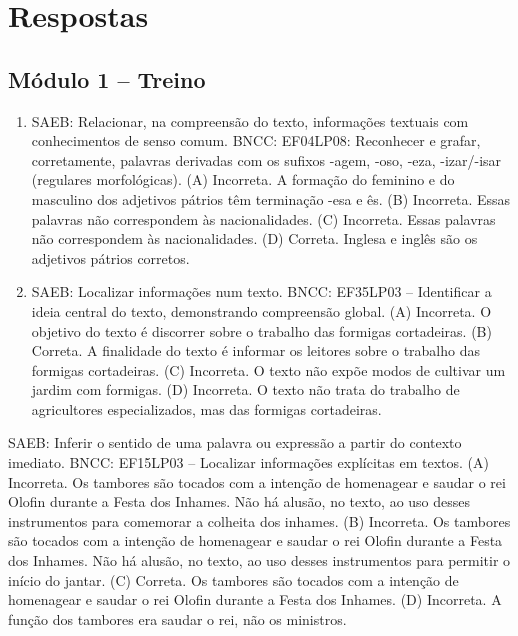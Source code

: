 
\chapter{Respostas}
\pagestyle{plain}
\footnotesize

\pagecolor{gray!40}

\section*{Módulo 1 – Treino}

\begin{enumerate}
\item
SAEB: Relacionar, na compreensão do texto, informações textuais
com conhecimentos de senso comum.
BNCC: EF04LP08: Reconhecer e grafar, corretamente, palavras derivadas
com os sufixos -agem, -oso, -eza, -izar/-isar (regulares morfológicas).
(A) Incorreta. A formação do feminino e do masculino dos adjetivos
pátrios têm terminação -esa e ês.
(B) Incorreta. Essas palavras não correspondem às nacionalidades.
(C) Incorreta. Essas palavras não correspondem às nacionalidades.
(D) Correta. Inglesa e inglês são os adjetivos pátrios corretos.

\item
SAEB: Localizar informações num texto.
BNCC: EF35LP03 -- Identificar a ideia central do texto, demonstrando
compreensão global.
(A) Incorreta. O objetivo do texto é discorrer sobre o trabalho das
formigas cortadeiras.
(B) Correta. A finalidade do texto é informar os leitores sobre o
trabalho das formigas cortadeiras.
(C) Incorreta. O texto não expõe modos de cultivar um jardim com formigas.
(D) Incorreta. O texto não trata do trabalho de agricultores 
especializados, mas das formigas cortadeiras.
\end{enumerate}

\item
SAEB: Inferir o sentido de uma palavra ou expressão a partir do
contexto imediato.
BNCC: EF15LP03 -- Localizar informações explícitas em textos.
(A) Incorreta. Os tambores são tocados com a intenção de homenagear e
saudar o rei Olofin durante a Festa dos Inhames. Não há alusão, no texto, ao uso desses instrumentos para comemorar a colheita dos inhames.
(B) Incorreta. Os tambores são tocados com a intenção de homenagear e
saudar o rei Olofin durante a Festa dos Inhames. Não há alusão, no texto, ao uso desses instrumentos para permitir o início do jantar.
(C) Correta. Os tambores são tocados com a intenção de homenagear e
saudar o rei Olofin durante a Festa dos Inhames.
(D) Incorreta. A função dos tambores era saudar o rei, não os ministros.


